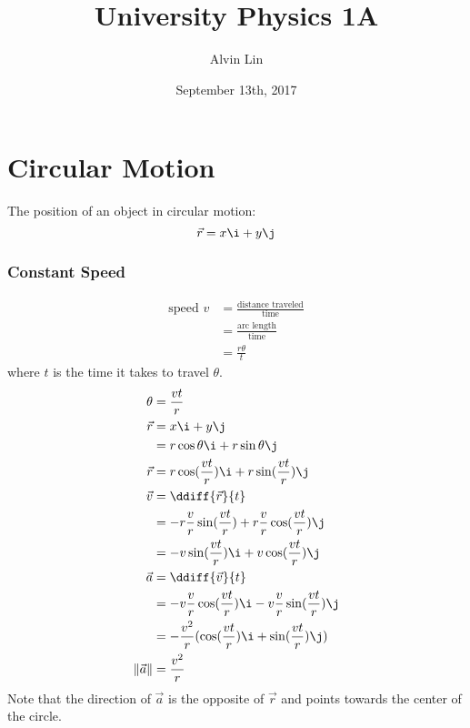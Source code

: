 \documentclass[letterpaper, 12pt]{math}
\title{University Physics 1A}
\author{Alvin Lin}
\date{September 13th, 2017}
\begin{document}
\maketitle

\section*{Circular Motion}
\begin{center}
\end{center}
The position of an object in circular motion:
\[ \vec{r} = x\i+y\j \]

\subsubsection*{Constant Speed}
\begin{align*}
  \text{speed } v &= \frac{\text{distance traveled}}{\text{time}} \\
  &= \frac{\text{arc length}}{\text{time}} \\
  &= \frac{r\theta}{t}
\end{align*}
where \( t \) is the time it takes to travel \( \theta \).
\begin{align*}
  \theta &= \frac{vt}{r} \\
  \vec{r} &= x\i+y\j \\
  &= r\cos\theta\i+r\sin\theta\j \\
  \vec{r} &= r\cos(\frac{vt}{r})\i+r\sin(\frac{vt}{r})\j \\
  \vec{v} &= \ddiff{\vec{r}}{t} \\
  &= -r\frac{v}{r}\sin(\frac{vt}{r})+r\frac{v}{r}\cos(\frac{vt}{r})\j \\
  &= -v\sin(\frac{vt}{r})\i+v\cos(\frac{vt}{r})\j \\
  \vec{a} &= \ddiff{\vec{v}}{t} \\
  &= -v\frac{v}{r}\cos(\frac{vt}{r})\i-v\frac{v}{r}\sin(\frac{vt}{r})\j \\
  &= -\frac{v^2}{r}(\cos(\frac{vt}{r})\i+\sin(\frac{vt}{r})\j) \\
  \|\vec{a}\| &= \frac{v^2}{r} \\
\end{align*}
Note that the direction of \( \vec{a} \) is the opposite of \( \vec{r} \) and
points towards the center of the circle.
\end{document}
